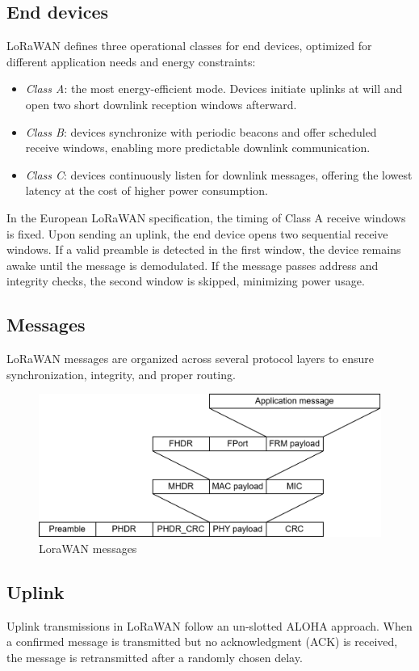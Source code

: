 \subsection{End devices}
LoRaWAN defines three operational classes for end devices, optimized for different application needs and energy constraints:
\begin{itemize}
    \item \textit{Class A}: the most energy-efficient mode. Devices initiate uplinks at will and open two short downlink reception windows afterward.
    \item \textit{Class B}: devices synchronize with periodic beacons and offer scheduled receive windows, enabling more predictable downlink communication.
    \item \textit{Class C}: devices continuously listen for downlink messages, offering the lowest latency at the cost of higher power consumption.
\end{itemize}
In the European LoRaWAN specification, the timing of Class A receive windows is fixed. 
Upon sending an uplink, the end device opens two sequential receive windows.
If a valid preamble is detected in the first window, the device remains awake until the message is demodulated. 
If the message passes address and integrity checks, the second window is skipped, minimizing power usage.

\subsection{Messages}
LoRaWAN messages are organized across several protocol layers to ensure synchronization, integrity, and proper routing.
\begin{figure}[H]
    \centering
    \includegraphics[width=0.5\linewidth]{images/iot12.png}
    \caption{LoraWAN messages}
\end{figure}

\subsection{Uplink}
Uplink transmissions in LoRaWAN follow an un-slotted ALOHA approach. 
When a confirmed message is transmitted but no acknowledgment (ACK) is received, the message is retransmitted after a randomly chosen delay.

